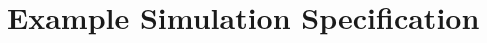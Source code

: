 \chapter{Example \SWEEP{} Simulation Specification}
\label{app:SweepSpecification}
\singlespacing
\scriptsize

\doublespacing

